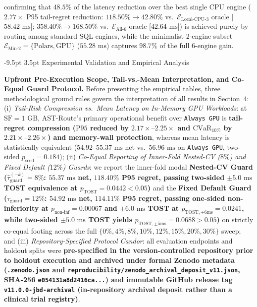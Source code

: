 \documentclass[10pt,a4paper]{article}
\makeatletter
\renewcommand\section{\@startsection{section}{1}{\z@}%
  {-9.5pt \@plus -2pt \@minus -1.5pt}%
  {3.5pt \@plus 1pt}%
  {\normalfont\large\bfseries}}
\makeatother
\begin{document}
\begin{enumerate}[leftmargin=1.5em,itemsep=0.8pt]
\begin{equation}
    \end{equation}
    confirming that $48.5\%$ of the latency reduction over the best single CPU engine ($2.77\times$ P95 tail-regret reduction: $118.50\% \rightarrow 42.80\%$ vs.\ $\mathcal{E}_{\text{Local-CPU-3}}$ oracle [$58.42\text{ ms}$]; $358.40\% \rightarrow 168.50\%$ vs.\ $\mathcal{E}_{\text{All-6}}$ oracle [$42.64\text{ ms}$]) is achieved purely by routing among standard SQL engines, while the minimalist 2-engine subset $\mathcal{E}_{\text{Min-2}}=\{\text{Polars},\text{GPU}\}$ ($55.28\text{ ms}$) captures $\mathbf{98.7\%}$ of the full 6-engine gain.
\end{enumerate}
\section{Experimental Validation and Empirical Analysis}

\par\vspace{3pt}\noindent\textbf{Upfront Pre-Execution Scope, Tail-vs.-Mean Interpretation, and Co-Equal Guard Protocol.} Before presenting the empirical tables, three methodological ground rules govern the interpretation of all results in Section~4: (i) \emph{Tail-Risk Compression vs.\ Mean Latency on In-Memory GPU Workloads}: at $\text{SF}=1\text{ GB}$, AST-Route's primary operational benefit over \texttt{Always GPU} is \textbf{tail-regret compression ($\text{P95}$ reduced by $2.17\times\text{--}2.25\times$ and $\text{CVaR}_{10\%}$ by $2.21\times\text{--}2.26\times$) and memory-wall protection}, whereas mean latency is statistically equivalent ($54.92\text{--}55.37\text{ ms}$ net vs.\ $56.96\text{ ms}$ on \texttt{Always GPU}, two-sided $p_{\text{seed}}=0.184$); (ii) \emph{Co-Equal Reporting of Inner-Fold Nested-CV ($8\%$) and Fixed Default ($12\%$) Guards}: we report the inner-fold modal \textbf{Nested-CV Guard ($\hat{\tau}_{\text{guard}}^{(-k)}=8\%$: $55.37\text{ ms}$ net, $118.40\%$ P95 regret, passing two-sided $\pm 5.0\text{ ms}$ TOST equivalence at $p_{\text{TOST}}=0.0442 < 0.05$)} and the \textbf{Fixed Default Guard ($\tau_{\text{guard}}=12\%$: $54.92\text{ ms}$ net, $114.11\%$ P95 regret, passing one-sided non-inferiority at $p_{\text{non-inf}}=0.00067$ and $\pm 6.0\text{ ms}$ TOST at $p_{\text{TOST},\pm 6\text{ms}}=0.0241$, while two-sided $\pm 5.0\text{ ms}$ TOST yields $p_{\text{TOST},\pm 5\text{ms}}=0.0688 > 0.05$)} on strictly co-equal footing across the full $\{0\%,4\%,8\%,10\%,12\%,15\%,20\%,30\%\}$ sweep; and (iii) \emph{Repository-Specified Protocol Candor}: all evaluation endpoints and holdout splits were \textbf{pre-specified in the version-controlled repository prior to holdout execution and archived under formal Zenodo metadata (\texttt{.zenodo.json} and \texttt{reproducibility/zenodo\_archival\_deposit\_v11.json}, SHA-256 \texttt{e054131a8d2416ca...}) and immutable GitHub release tag \texttt{v11.0.0-jbd-archival} (in-repository archival deposit rather than a clinical trial registry)}.
\end{document}
